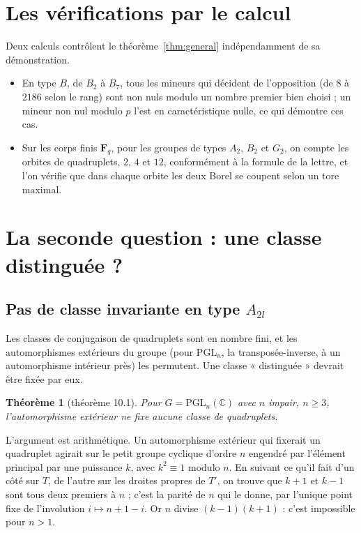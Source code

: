 \documentclass[11pt,a4paper]{amsart}
\theoremstyle{definition}
\theoremstyle{plain}
\newtheorem{theoreme}{Théorème}
\theoremstyle{remark}
\newcommand{\C}{\mathbb C}
\newcommand{\PGL}{\mathrm{PGL}}
\begin{document}
\section{Les vérifications par le calcul}

Deux calculs contrôlent le théorème~\ref{thm:general} indépendamment de sa démonstration.
\begin{itemize}
\item En type $B$, de $B_2$ à $B_7$, tous les mineurs qui décident de l'opposition (de $8$ à $2186$ selon le rang) sont non nuls modulo un nombre premier bien choisi ; un mineur non nul modulo $p$ l'est en caractéristique nulle, ce qui démontre ces cas.
\item Sur les corps finis $\mathbf F_q$, pour les groupes de types $A_2$, $B_2$ et $G_2$, on compte les orbites de quadruplets, $2$, $4$ et $12$, conformément à la formule de la lettre, et l'on vérifie que dans chaque orbite les deux Borel se coupent selon un tore maximal.
\end{itemize}

\section{La seconde question : une classe distinguée ?}

\subsection{Pas de classe invariante en type $A_{2l}$}

Les classes de conjugaison de quadruplets sont en nombre fini, et les automorphismes extérieurs du groupe (pour $\PGL_n$, la transposée-inverse, à un automorphisme intérieur près) les permutent. Une classe « distinguée » devrait être fixée par eux.

\begin{theoreme}[théorème 10.1]
Pour $G = \PGL_n(\C)$ avec $n$ impair, $n \ge 3$, l'automorphisme extérieur ne fixe aucune classe de quadruplets.
\end{theoreme}

L'argument est arithmétique. Un automorphisme extérieur qui fixerait un quadruplet agirait sur le petit groupe cyclique d'ordre $n$ engendré par l'élément principal par une puissance $k$, avec $k^2 \equiv 1$ modulo $n$. En suivant ce qu'il fait d'un côté sur $T$, de l'autre sur les droites propres de $T'$, on trouve que $k+1$ et $k-1$ sont tous deux premiers à $n$ ; c'est la parité de $n$ qui le donne, par l'unique point fixe de l'involution $i \mapsto n+1-i$. Or $n$ divise $(k-1)(k+1)$ : c'est impossible pour $n > 1$.
\end{document}
